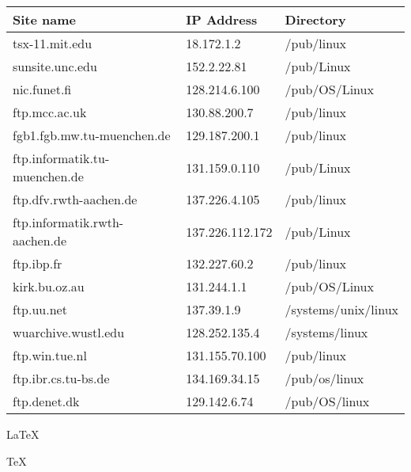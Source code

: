 {\newpage
\clearpage
\samepage \begin{table}[ht]\begin{center}
\small\begin{tabular}{lll} 
\hline
Site name                            &  IP Address      & Directory \\  
\hline
tsx-11.mit.edu                       &  18.172.1.2      & /pub/linux \\ 
sunsite.unc.edu                      &  152.2.22.81     & /pub/Linux \\ 
nic.funet.fi                         &  128.214.6.100   & /pub/OS/Linux \\ 
ftp.mcc.ac.uk                        &  130.88.200.7    & /pub/linux \\ 
fgb1.fgb.mw.tu-muenchen.de           &  129.187.200.1   & /pub/linux \\ 
ftp.informatik.tu-muenchen.de        &  131.159.0.110   & /pub/Linux \\ 
ftp.dfv.rwth-aachen.de               &  137.226.4.105   & /pub/linux \\ 
ftp.informatik.rwth-aachen.de        &  137.226.112.172 & /pub/Linux \\ 
ftp.ibp.fr                           &  132.227.60.2    & /pub/linux \\ 
kirk.bu.oz.au                        &  131.244.1.1     & /pub/OS/Linux \\ 
ftp.uu.net                           &  137.39.1.9      & /systems/unix/linux \\ 
wuarchive.wustl.edu                  &  128.252.135.4   & /systems/linux \\ 
ftp.win.tue.nl                       &  131.155.70.100  & /pub/linux \\ 
ftp.ibr.cs.tu-bs.de                  &  134.169.34.15   & /pub/os/linux \\ 
ftp.denet.dk                         &  129.142.6.74    & /pub/OS/linux \\ 
\end{tabular}\normalsize\rm

\label{table-ftp-sites}
\end{center}\end{table}
}

{\newpage
\clearpage
\samepage {}
}

{\newpage
\clearpage
\samepage {}
}

{\newpage
\clearpage
\samepage {}
}

{\newpage
\clearpage
\samepage \LaTeX
}

{\newpage
\clearpage
\samepage \TeX
}




